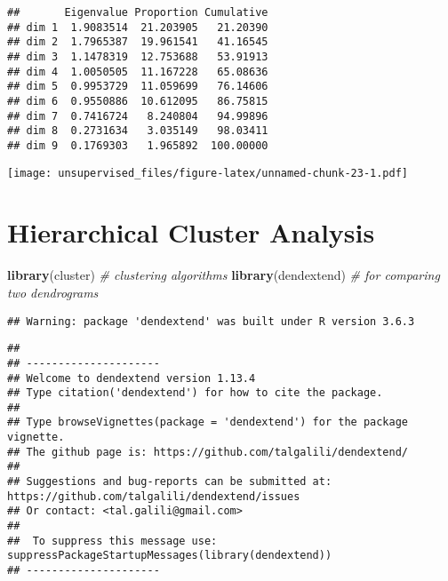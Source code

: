 \documentclass[
]{article}
\newenvironment{Shaded}{\begin{snugshade}}{\end{snugshade}}
\newcommand{\CommentTok}[1]{\textcolor[rgb]{0.56,0.35,0.01}{\textit{#1}}}
\newcommand{\DataTypeTok}[1]{\textcolor[rgb]{0.13,0.29,0.53}{#1}}
\newcommand{\DecValTok}[1]{\textcolor[rgb]{0.00,0.00,0.81}{#1}}
\newcommand{\KeywordTok}[1]{\textcolor[rgb]{0.13,0.29,0.53}{\textbf{#1}}}
\newcommand{\NormalTok}[1]{#1}
\newcommand{\OperatorTok}[1]{\textcolor[rgb]{0.81,0.36,0.00}{\textbf{#1}}}
\newcommand{\StringTok}[1]{\textcolor[rgb]{0.31,0.60,0.02}{#1}}
\begin{document}
\begin{verbatim}
##       Eigenvalue Proportion Cumulative
## dim 1  1.9083514  21.203905   21.20390
## dim 2  1.7965387  19.961541   41.16545
## dim 3  1.1478319  12.753688   53.91913
## dim 4  1.0050505  11.167228   65.08636
## dim 5  0.9953729  11.059699   76.14606
## dim 6  0.9550886  10.612095   86.75815
## dim 7  0.7416724   8.240804   94.99896
## dim 8  0.2731634   3.035149   98.03411
## dim 9  0.1769303   1.965892  100.00000
\end{verbatim}

\begin{Shaded}
\end{Shaded}

\texttt{[image: unsupervised\_files/figure-latex/unnamed-chunk-23-1.pdf]}

\hypertarget{hierarchical-cluster-analysis}{%
\section{Hierarchical Cluster
Analysis}\label{hierarchical-cluster-analysis}}

\begin{Shaded}
\begin{Highlighting}[]
\KeywordTok{library}\NormalTok{(cluster)    }\CommentTok{# clustering algorithms}
\KeywordTok{library}\NormalTok{(dendextend) }\CommentTok{# for comparing two dendrograms}
\end{Highlighting}
\end{Shaded}

\begin{verbatim}
## Warning: package 'dendextend' was built under R version 3.6.3
\end{verbatim}

\begin{verbatim}
## 
## ---------------------
## Welcome to dendextend version 1.13.4
## Type citation('dendextend') for how to cite the package.
## 
## Type browseVignettes(package = 'dendextend') for the package vignette.
## The github page is: https://github.com/talgalili/dendextend/
## 
## Suggestions and bug-reports can be submitted at: https://github.com/talgalili/dendextend/issues
## Or contact: <tal.galili@gmail.com>
## 
##  To suppress this message use:  suppressPackageStartupMessages(library(dendextend))
## ---------------------
\end{verbatim}
\end{document}
